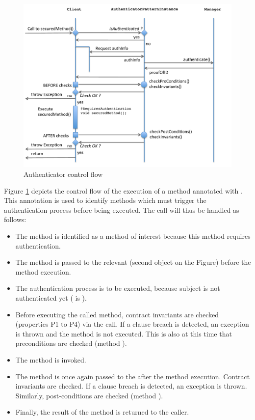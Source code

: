 \begin{figure}
    \centering
    \includegraphics[width=1.0 \columnwidth]{AuthenticatorControlFlow.pdf}
    \caption{Authenticator control flow}
    \label{fig:AuthenticatorControlFlow}
\end{figure}

Figure \ref{fig:AuthenticatorControlFlow} depicts  the control flow of the execution of a method annotated with . 
This annotation is used to identify methods which must trigger the authentication process before being executed. The call will thus be handled as follows:
\begin{itemize}
	\item The method is identified as a method of interest because this method requires authentication.
	\item The method is passed to the relevant  (second object on the Figure) before the method execution.
	\item The authentication process is to be executed, because subject is not authenticated yet ( is ).
	\item Before executing the called method, contract invariants are checked (properties P1 to P4) via the  call. If a clause breach is detected, an exception is thrown and the method is not executed. This is also at this time that preconditions are checked (method ).
	\item The method is invoked.
	\item The method is once again passed to the  after the method execution. Contract invariants are checked. If a clause breach is detected, an exception is thrown. Similarly,  post-conditions are checked (method ).
	\item Finally, the result of the method is returned to the caller.
\end{itemize}

